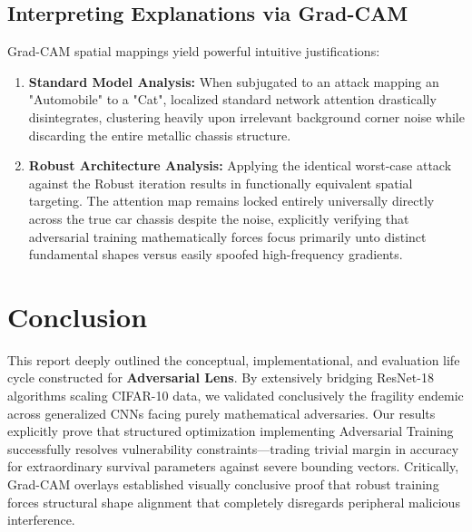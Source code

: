 \documentclass[12pt,a4paper]{article}
\begin{document}
\subsection{Interpreting Explanations via Grad-CAM}
Grad-CAM spatial mappings yield powerful intuitive justifications:
\begin{enumerate}
    \item \textbf{Standard Model Analysis:} When subjugated to an attack mapping an "Automobile" to a "Cat", localized standard network attention drastically disintegrates, clustering heavily upon irrelevant background corner noise while discarding the entire metallic chassis structure.
    \item \textbf{Robust Architecture Analysis:} Applying the identical worst-case attack against the Robust iteration results in functionally equivalent spatial targeting. The attention map remains locked entirely universally directly across the true car chassis despite the noise, explicitly verifying that adversarial training mathematically forces focus primarily unto distinct fundamental shapes versus easily spoofed high-frequency gradients.
\end{enumerate}

\section{Conclusion}
This report deeply outlined the conceptual, implementational, and evaluation life cycle constructed for \textbf{Adversarial Lens}. By extensively bridging ResNet-18 algorithms scaling CIFAR-10 data, we validated conclusively the fragility endemic across generalized CNNs facing purely mathematical adversaries. Our results explicitly prove that structured optimization implementing Adversarial Training successfully resolves vulnerability constraints—trading trivial margin in accuracy for extraordinary survival parameters against severe bounding vectors. Critically, Grad-CAM overlays established visually conclusive proof that robust training forces structural shape alignment that completely disregards peripheral malicious interference.

\end{document}

